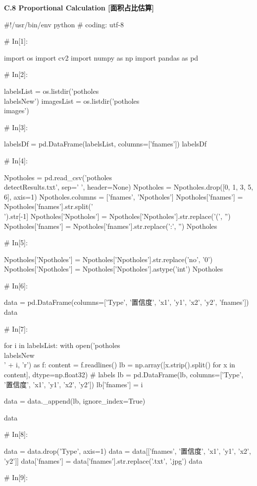 \documentclass{MathorCupmodeling}
\begin{document}
\textbf{C.8 Proportional Calculation [面积占比估算]}
\begin{python}
#!/usr/bin/env python
# coding: utf-8

# In[1]:


import os
import cv2
import numpy as np
import pandas as pd

# In[2]:


labelsList = os.listdir('potholes\\labelsNew')
imagesList = os.listdir('potholes\\images')

# In[3]:


labelsDf = pd.DataFrame(labelsList, columns=['fnames'])
labelsDf

# In[4]:


Npotholes = pd.read_csv('potholes\\detectResults.txt', sep=' ', header=None)
Npotholes = Npotholes.drop([0, 1, 3, 5, 6], axis=1)
Npotholes.columns = ['fnames', 'Npotholes']
Npotholes['fnames'] = Npotholes['fnames'].str.split('\\').str[-1]
Npotholes['Npotholes'] = Npotholes['Npotholes'].str.replace('(', '')
Npotholes['fnames'] = Npotholes['fnames'].str.replace(':', '')
Npotholes

# In[5]:


Npotholes['Npotholes'] = Npotholes['Npotholes'].str.replace('no', '0')
Npotholes['Npotholes'] = Npotholes['Npotholes'].astype('int')
Npotholes

# In[6]:


data = pd.DataFrame(columns=['Type', '置信度', 'x1', 'y1', 'x2', 'y2', 'fnames'])
data

# In[7]:


for i in labelsList:
    with open('potholes\\labelsNew\\' + i, 'r') as f:
        content = f.readlines()
        lb = np.array([x.strip().split() for x in content], dtype=np.float32)  # labels
        lb = pd.DataFrame(lb, columns=['Type', '置信度', 'x1', 'y1', 'x2', 'y2'])
        lb['fnames'] = i

    data = data._append(lb, ignore_index=True)

data

# In[8]:


data = data.drop('Type', axis=1)
data = data[['fnames', '置信度', 'x1', 'y1', 'x2', 'y2']]
data['fnames'] = data['fnames'].str.replace('.txt', '.jpg')
data

# In[9]:



\end{python}
\end{document}

